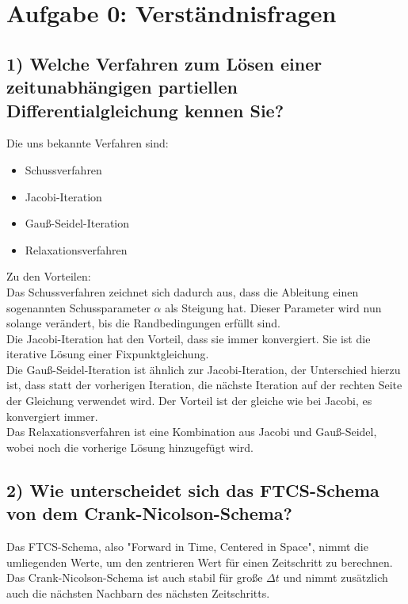 \setcounter{secnumdepth}{0}
\section{Aufgabe 0: Verständnisfragen}
\label{sec:auf0}

\subsection{1) Welche Verfahren zum Lösen einer zeitunabhängigen partiellen Differentialgleichung kennen Sie?}
Die uns bekannte Verfahren sind:
\begin{itemize}
    \item Schussverfahren
    \item Jacobi-Iteration
    \item Gauß-Seidel-Iteration
    \item Relaxationsverfahren
\end{itemize}
Zu den Vorteilen:\\
Das Schussverfahren zeichnet sich dadurch aus, dass die Ableitung einen sogenannten Schussparameter $\alpha$ als Steigung hat.
Dieser Parameter wird nun solange verändert, bis die Randbedingungen erfüllt sind.
\newline\\
Die Jacobi-Iteration hat den Vorteil, dass sie immer konvergiert.
Sie ist die iterative Lösung einer Fixpunktgleichung.
\newline\\
Die Gauß-Seidel-Iteration ist ähnlich zur Jacobi-Iteration, der Unterschied hierzu ist, dass statt der vorherigen Iteration, die nächste Iteration auf der rechten Seite der Gleichung verwendet wird.
Der Vorteil ist der gleiche wie bei Jacobi, es konvergiert immer.
\newline\\
Das Relaxationsverfahren ist eine Kombination aus Jacobi und Gauß-Seidel, wobei noch die vorherige Lösung hinzugefügt wird.
\subsection{2) Wie unterscheidet sich das FTCS-Schema von dem Crank-Nicolson-Schema?}
Das FTCS-Schema, also "Forward in Time, Centered in Space", nimmt die umliegenden Werte, um den zentrieren Wert für einen Zeitschritt zu berechnen.
Das Crank-Nicolson-Schema ist auch stabil für große $\Delta t$ und nimmt zusätzlich auch die nächsten Nachbarn des nächsten Zeitschritts.